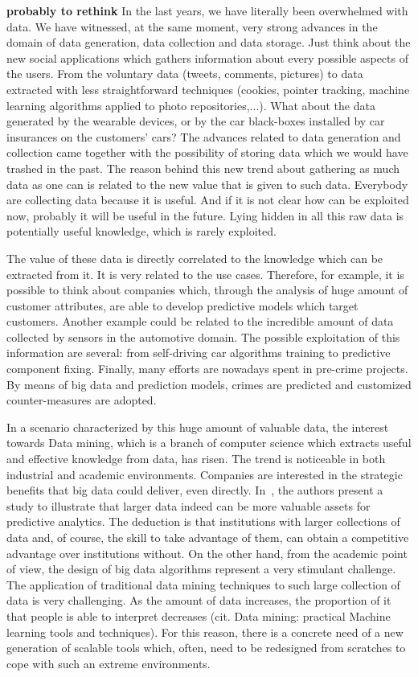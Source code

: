 \textbf{probably to rethink} In the last years, we have literally been overwhelmed with data. 
We have witnessed, at the same moment, very strong advances in the domain of data generation, data collection and data storage.
Just think about the new social applications which gathers information about every possible aspects of the users. From the voluntary data (tweets, comments, pictures) to data extracted with less straightforward techniques (cookies, pointer tracking, machine learning algorithms applied to photo repositories,...). What about the data generated by the wearable devices, or by the car black-boxes installed by car insurances on the customers' cars?
The advances related to data generation and collection came together with the possibility of storing data which we would have trashed in the past. The reason behind this new trend about gathering as much data as one can is related to the new value that is given to such data.
Everybody are collecting data because it is useful. And if it is not clear how can be exploited now, probably it will be useful in the future.
Lying hidden in all this raw data is potentially useful knowledge, which is rarely exploited. 

The value of these data is directly correlated to the knowledge which can be extracted from it. It is very related to the use cases. Therefore, for example, it is possible to think about companies which, through the analysis of huge amount of customer attributes, are able to develop predictive models which target customers. Another example could be related to the incredible amount of data collected by sensors in the automotive domain. The possible exploitation of this information are several: from self-driving car algorithms training to predictive component fixing. Finally, many efforts are nowadays spent in pre-crime projects. By means of big data and prediction models, crimes are predicted and customized counter-measures are adopted.

In a scenario characterized by this huge amount of valuable data,  the interest towards Data mining, which is a branch of computer science which extracts useful and effective knowledge from data, has risen. The trend is noticeable in both industrial and academic environments. Companies are
interested in the strategic benefits that big data could deliver, even directly.
In~\cite{junque2013predictive}, the authors present a study to illustrate that
larger data indeed can be more valuable assets for predictive analytics. The
deduction is that institutions with larger collections of data and, of course,
the skill to take advantage of them, can obtain a competitive advantage over
institutions without. On the other hand, from the academic point of view, the design of big data algorithms represent a very stimulant challenge. The application of traditional data mining techniques to such large collection of data is very challenging. As the amount of data increases, the proportion of it that people is able to interpret decreases (cit. Data mining: practical Machine learning tools and techniques). For this reason, there is a concrete need of a new generation of scalable tools which, often, need to be redesigned from scratches to cope with such an extreme environments.

